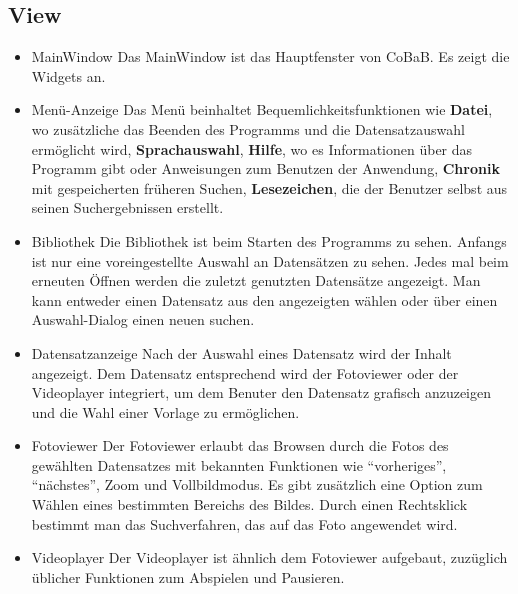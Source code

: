 \subsection{View}
\begin{itemize}
\item MainWindow \newline
Das MainWindow ist das Hauptfenster von CoBaB. Es zeigt die \glspl{Widget} an.

\item Menü-Anzeige \newline
Das Menü beinhaltet Bequemlichkeitsfunktionen wie \textbf{Datei}, wo zusätzliche das Beenden des Programms und die Datensatzauswahl ermöglicht wird, \textbf{Sprachauswahl}, \textbf{Hilfe}, wo es Informationen über das Programm gibt oder Anweisungen zum Benutzen der Anwendung, \textbf{Chronik} mit gespeicherten früheren Suchen, \textbf{Lesezeichen}, die der Benutzer selbst aus seinen Suchergebnissen erstellt.

\item Bibliothek \newline
Die Bibliothek ist beim Starten des Programms zu sehen. Anfangs ist nur eine voreingestellte Auswahl an Datensätzen zu sehen. Jedes mal beim erneuten Öffnen werden die zuletzt genutzten Datensätze angezeigt. Man kann entweder einen Datensatz aus den angezeigten wählen oder über einen Auswahl-\gls{Dialog} einen neuen suchen.

\item Datensatzanzeige \newline
Nach der Auswahl eines Datensatz wird der Inhalt angezeigt. Dem Datensatz entsprechend wird der Fotoviewer oder der Videoplayer integriert, um dem Benuter den Datensatz grafisch anzuzeigen und die Wahl einer Vorlage zu ermöglichen.

\item Fotoviewer \newline
Der Fotoviewer erlaubt das Browsen durch die Fotos des gewählten Datensatzes mit bekannten Funktionen wie \enquote{vorheriges}, \enquote{nächstes}, Zoom und Vollbildmodus. Es gibt zusätzlich eine Option zum Wählen eines bestimmten Bereichs des Bildes. Durch einen Rechtsklick bestimmt man das Suchverfahren, das auf das Foto angewendet wird.

\item Videoplayer \newline
Der Videoplayer ist ähnlich dem Fotoviewer aufgebaut, zuzüglich üblicher Funktionen zum Abspielen und Pausieren.


\end{itemize}
